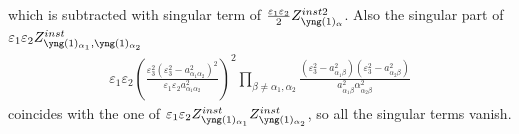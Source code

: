\documentclass[12pt]{article}
\numberwithin{equation}{section}
\theoremstyle{definition}
\begin{document}
which is subtracted with singular term of $\frac{\varepsilon_1 \varepsilon_2 }{2} Z^{inst 2}_{\fontsize{2.5}{4}\selectfont\yng(1)_{\alpha}}$. Also the singular part of $\varepsilon_1 \varepsilon_2 Z^{inst}_{\fontsize{2.5}{4}\selectfont\yng(1)_{\alpha_1 },  \fontsize{2.5}{4}\selectfont\yng(1)_{\alpha_2 }}$
\begin{align*}
    \varepsilon_1 \varepsilon_2 \left( \frac{\varepsilon_3^2 (\varepsilon_3^2 - a_{\alpha_1 \alpha_2}^2)^2}{\varepsilon_1 \varepsilon_2 a_{\alpha_1 \alpha_2}^2}\right)^2 \prod\limits_{\beta \neq \alpha_1 , \alpha_2} \frac{(\varepsilon_3^2 - a_{\alpha_1 \beta}^2)(\varepsilon_3^2 - a_{\alpha_2 \beta}^2)}{a_{\alpha_1 \beta}^2 \alpha_{\alpha_2 \beta}^2}
\end{align*}
coincides with the one of $\varepsilon_1 \varepsilon_2 Z^{inst}_{\fontsize{2.5}{4}\selectfont\yng(1)_{\alpha_1}} Z^{inst}_{\fontsize{2.5}{4}\selectfont\yng(1)_{\alpha_2}}$, so all the singular terms vanish.
\end{document}
